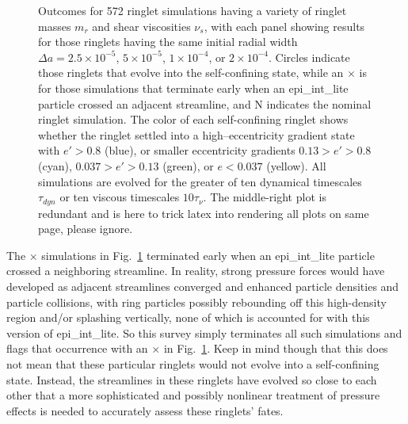 \documentclass[preprint]{aastex62}
\begin{document}
\begin{figure}
    \caption{
        \label{fig:sim_grid_da}
        Outcomes for 572 ringlet simulations having a variety of ringlet
        masses $m_r$ and shear viscosities $\nu_s$, with each panel showing results
        for those ringlets having the same initial radial width
        $\Delta a=2.5\times10^{-5}$, $5\times10^{-5}$, $1\times10^{-4}$, or $2\times10^{-4}$. Circles 
        indicate those ringlets that evolve into the self-confining state, while an $\times$ is
        for those simulations that terminate early when an epi\_int\_lite particle crossed an adjacent streamline,
        and N indicates the nominal ringlet simulation. The color of each self-confining ringlet shows
        whether the ringlet settled into a high--eccentricity gradient state with $e'> 0.8$ (blue),
        or smaller eccentricity gradients $0.13> e'>0.8$ (cyan), $0.037> e'>0.13$ (green), or $e<0.037$ (yellow).
        All simulations are evolved for the greater of ten dynamical timescales $\tau_{dyn}$
        or ten viscous timescales $10\tau_{\nu}$.
        The middle-right plot is redundant and is here to trick latex into rendering all plots on same page, please ignore.
    }
\end{figure}

The $\times$ simulations in Fig.\ \ref{fig:sim_grid_da}
terminated early when an epi\_int\_lite particle crossed a 
neighboring streamline. In reality, strong 
pressure forces would have developed as adjacent streamlines converged
and enhanced particle densities and particle collisions, with ring particles
possibly rebounding off this high-density region and/or splashing vertically,
none of which is accounted for with this version of epi\_int\_lite. 
So this survey simply terminates all such simulations and flags that occurrence with an 
$\times$ in Fig.\ \ref{fig:sim_grid_da}. Keep in mind though that this does not mean
that these particular ringlets would not evolve into a self-confining state. Instead,
the streamlines in these ringlets have evolved so close to each other that a more sophisticated
and possibly nonlinear treatment of pressure effects is needed 
to accurately assess these ringlets' fates.
\end{document}
